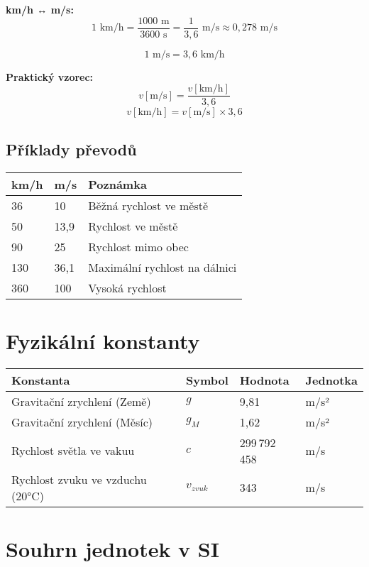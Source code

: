 \documentclass[11pt,a4paper]{article}
\begin{document}
\textbf{km/h ↔ m/s:}
\[1 \text{ km/h} = \frac{1000 \text{ m}}{3600 \text{ s}} = \frac{1}{3{,}6} \text{ m/s} \approx 0{,}278 \text{ m/s}\]

\[1 \text{ m/s} = 3{,}6 \text{ km/h}\]

\textbf{Praktický vzorec:}
\[v[\text{m/s}] = \frac{v[\text{km/h}]}{3{,}6}\]
\[v[\text{km/h}] = v[\text{m/s}] \times 3{,}6\]

\subsection{Příklady převodů}

\begin{longtable}{lll}
\toprule
km/h & m/s & Poznámka \\
\midrule
36 & 10 & Běžná rychlost ve městě \\
50 & 13,9 & Rychlost ve městě \\
90 & 25 & Rychlost mimo obec \\
130 & 36,1 & Maximální rychlost na dálnici \\
360 & 100 & Vysoká rychlost \\
\bottomrule
\end{longtable}

\clearpage

\section{Fyzikální konstanty}

\begin{longtable}{llll}
\toprule
Konstanta & Symbol & Hodnota & Jednotka \\
\midrule
Gravitační zrychlení (Země) & $g$ & 9,81 & m/s² \\
Gravitační zrychlení (Měsíc) & $g_M$ & 1,62 & m/s² \\
Rychlost světla ve vakuu & $c$ & 299\,792\,458 & m/s \\
Rychlost zvuku ve vzduchu (20°C) & $v_{zvuk}$ & 343 & m/s \\
\bottomrule
\end{longtable}

\clearpage

\section{Souhrn jednotek v SI}
\end{document}
